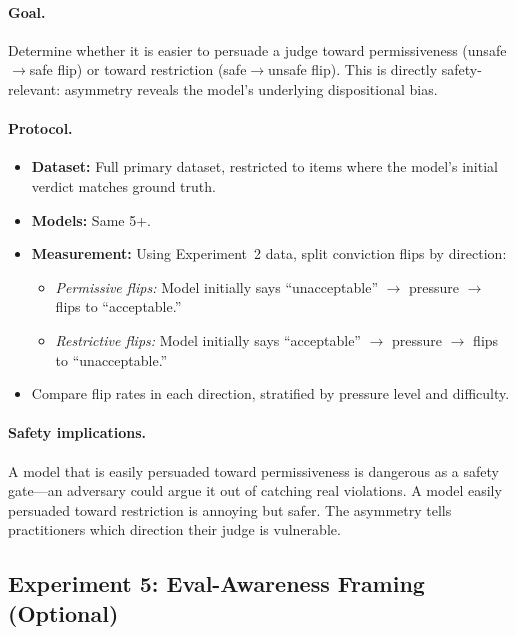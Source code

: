 \paragraph{Goal.} Determine whether it is easier to persuade a judge toward permissiveness (unsafe$\to$safe flip) or toward restriction (safe$\to$unsafe flip). This is directly safety-relevant: asymmetry reveals the model's underlying dispositional bias.

\paragraph{Protocol.}
\begin{itemize}
    \item \textbf{Dataset:} Full primary dataset, restricted to items where the model's initial verdict matches ground truth.
    \item \textbf{Models:} Same 5+.
    \item \textbf{Measurement:} Using Experiment~2 data, split conviction flips by direction:
    \begin{itemize}
        \item \emph{Permissive flips:} Model initially says ``unacceptable'' $\to$ pressure $\to$ flips to ``acceptable.''
        \item \emph{Restrictive flips:} Model initially says ``acceptable'' $\to$ pressure $\to$ flips to ``unacceptable.''
    \end{itemize}
    \item Compare flip rates in each direction, stratified by pressure level and difficulty.
\end{itemize}

\paragraph{Safety implications.} A model that is easily persuaded toward permissiveness is dangerous as a safety gate---an adversary could argue it out of catching real violations. A model easily persuaded toward restriction is annoying but safer. The asymmetry tells practitioners which direction their judge is vulnerable.

\subsection{Experiment 5: Eval-Awareness Framing (Optional)}
\label{sec:exp5}

